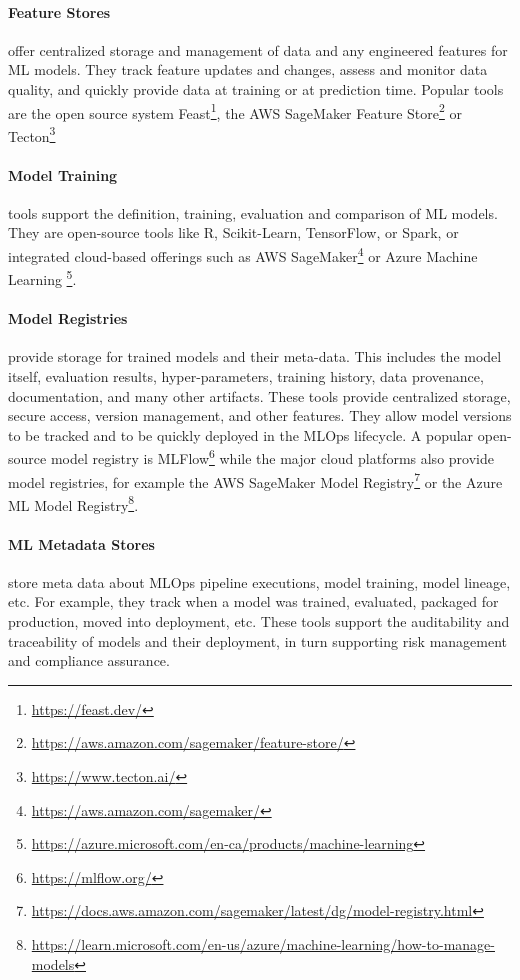 \paragraph*{Feature Stores} offer centralized storage and management of data and any engineered features for ML models. They track feature updates and changes, assess and monitor data quality, and quickly provide data at training or at prediction time. Popular tools are the open source system Feast\footnote{\url{https://feast.dev/}}, the AWS SageMaker Feature Store\footnote{\url{https://aws.amazon.com/sagemaker/feature-store/}} or Tecton\footnote{\url{https://www.tecton.ai/}}

\paragraph*{Model Training} tools support the definition, training, evaluation and comparison of ML models. They are open-source tools like R, Scikit-Learn, TensorFlow, or Spark, or integrated cloud-based offerings such as AWS SageMaker\footnote{\url{https://aws.amazon.com/sagemaker/}} or Azure Machine Learning \footnote{\url{https://azure.microsoft.com/en-ca/products/machine-learning}}. 

\paragraph*{Model Registries} provide storage for trained models and their meta-data. This includes the model itself, evaluation results, hyper-parameters, training history, data provenance, documentation, and many other artifacts. These tools provide centralized storage, secure access, version management, and other features. They allow model versions to be tracked and to be quickly deployed in the MLOps lifecycle. A popular open-source model registry is MLFlow\footnote{\url{https://mlflow.org/}} while the major cloud platforms also provide model registries, for example the AWS SageMaker Model Registry\footnote{\url{https://docs.aws.amazon.com/sagemaker/latest/dg/model-registry.html}} or the Azure ML Model Registry\footnote{\url{https://learn.microsoft.com/en-us/azure/machine-learning/how-to-manage-models}}.

\paragraph*{ML Metadata Stores} store meta data about MLOps pipeline executions, model training, model lineage, etc. For example, they track when a model was trained, evaluated, packaged for production, moved into deployment, etc. These tools support the auditability and traceability of models and their deployment, in turn supporting risk management and compliance assurance.


